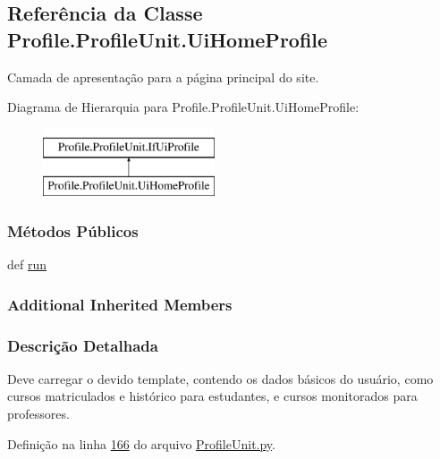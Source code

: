 \hypertarget{classProfile_1_1ProfileUnit_1_1UiHomeProfile}{\subsection{Referência da Classe Profile.\-Profile\-Unit.\-Ui\-Home\-Profile}
\label{classProfile_1_1ProfileUnit_1_1UiHomeProfile}
}


Camada de apresentação para a página principal do site.  


Diagrama de Hierarquia para Profile.\-Profile\-Unit.\-Ui\-Home\-Profile\-:\begin{figure}[H]
\begin{center}
\leavevmode
\includegraphics[height=2.000000cm]{db/dcf/classProfile_1_1ProfileUnit_1_1UiHomeProfile}
\end{center}
\end{figure}
\subsubsection*{Métodos Públicos}
\begin{DoxyCompactItemize}
\item 
def \hyperlink{classProfile_1_1ProfileUnit_1_1UiHomeProfile_a5abc7f7c1ca1cb3e070c36a869263e6d}{run}
\end{DoxyCompactItemize}
\subsubsection*{Additional Inherited Members}


\subsubsection{Descrição Detalhada}
Deve carregar o devido template, contendo os dados básicos do usuário, como cursos matriculados e histórico para estudantes, e cursos monitorados para professores. 

Definição na linha \hyperlink{ProfileUnit_8py_source_l00166}{166} do arquivo \hyperlink{ProfileUnit_8py_source}{Profile\-Unit.\-py}.




